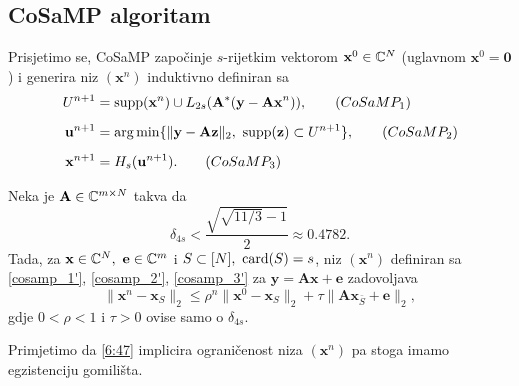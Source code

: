 \documentclass[a4paper,twoside,12pt]{memoir} %
\newcommand{\vect}[1]{\mathbf{#1}}
\renewcommand{\vec}{\vect}
\newcommand{\card}{\text{\normalfont{card}}}
\newcommand{\supp}{\text{\normalfont{supp}}}
\newcommand{\norm}[1]{\|{#1}\|}
\DeclareMathOperator*{\argmin}{arg\,min}
\begin{document}
\subsection[CoSaMP algoritam][CoSaMP algoritam]{CoSaMP algoritam}
Prisjetimo se, CoSaMP zapo\v{c}inje $s$-rijetkim vektorom $\vec x^0 \in \C^N$ (uglavnom $\vec x^0 = \vec 0$) i generira niz $(\vec x^n)$ induktivno definiran sa
\begin{align}
    U^{n+1} & = \supp(\vec x^n) \cup L_{2s}(\vec A^*(\vec y - \vec {Ax}^n)),\tag{$CoSaMP_1$}\label{cosamp_1'}\\[0.5em]
    \vec u^{n+1} &= \argmin \{\norm{\vec y - \vec {Az}}_2,\ \supp(\vec z) \subset U^{n+1}\},\tag{$CoSaMP_2$}\label{cosamp_2'}\\[0.5em]
    \vec x^{n+1} &= H_s(\vec u ^{n+1}).\tag{$CoSaMP_3$}\label{cosamp_3'}
\end{align}
\begin{thm}\label{tm:6:27}
    Neka je $\vec A \in \C^{m \times N}$ takva da
    \begin{equation}\label{6:46}
        \delta_{4s} < \frac{\sqrt{\sqrt{11/3}-1}}{2} \approx 0.4782.  
    \end{equation}
    Tada, za $\vec x \in \C^N,\ \vec e \in \C^m$ i $S \subset [N],\ \card(S)=s$, niz $(\vec x^n)$ definiran sa \eqref{cosamp_1'}, \eqref{cosamp_2'}, \eqref{cosamp_3'} za $\vec y = \vec{Ax} + \vec e$ zadovoljava
    \begin{equation}\label{6:47}
        \norm{\vec x^n - \vec x_S}_2 \leq \rho^n \norm{\vec x^0 - \vec x_S}_2 + \tau \norm{\vec{Ax}_{\bar S} + \vec e}_2,
    \end{equation}
    gdje $0<\rho<1$ i $\tau > 0$ ovise samo o $\delta_{4s}$.
\end{thm}

Primjetimo da \eqref{6:47} implicira ograni\v{c}enost niza $(\vec x^n)$ pa stoga imamo egzistenciju gomili\v{s}ta.
\end{document}
